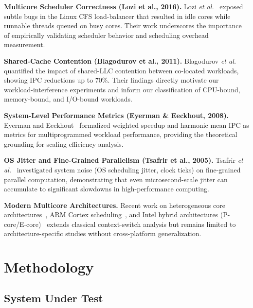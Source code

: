 \documentclass[conference]{IEEEtran}
\begin{document}
\textbf{Multicore Scheduler Correctness (Lozi et al., 2016).}
Lozi \textit{et al.}~\cite{lozi2016linux} exposed subtle bugs in the Linux
CFS load-balancer that resulted in idle cores while runnable threads queued
on busy cores. Their work underscores the importance of empirically validating
scheduler behavior and scheduling overhead measurement.

\textbf{Shared-Cache Contention (Blagodurov et al., 2011).}
Blagodurov \textit{et al.}~\cite{blagodurov2011numa} quantified the impact of
shared-LLC contention between co-located workloads, showing IPC reductions up
to 70\%. Their findings directly motivate our workload-interference experiments
and inform our classification of CPU-bound, memory-bound, and I/O-bound
workloads.

\textbf{System-Level Performance Metrics (Eyerman \& Eeckhout, 2008).}
Eyerman and Eeckhout~\cite{eyerman2008system} formalized weighted speedup and
harmonic mean IPC as metrics for multiprogrammed workload performance,
providing the theoretical grounding for scaling efficiency analysis.

\textbf{OS Jitter and Fine-Grained Parallelism (Tsafrir et al., 2005).}
Tsafrir \textit{et al.}~\cite{tsafrir2005noise} investigated system noise
(OS scheduling jitter, clock ticks) on fine-grained parallel computation,
demonstrating that even microsecond-scale jitter can accumulate to significant
slowdowns in high-performance computing.

\textbf{Modern Multicore Architectures.}
Recent work on heterogeneous core architectures~\cite{arm2021big}, ARM Cortex
scheduling~\cite{arm2020scheduling}, and Intel hybrid architectures
(P-core/E-core)~\cite{intel2022alder} extends classical context-switch analysis
but remains limited to architecture-specific studies without cross-platform
generalization.

\section{Methodology}
\label{sec:methodology}

\subsection{System Under Test}
\end{document}
